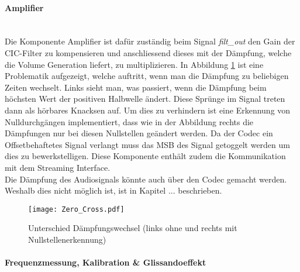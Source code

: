 \paragraph{Amplifier}\mbox{}\\

Die Komponente Amplifier ist dafür zuständig beim Signal \textit{filt\_out} den Gain der CIC-Filter zu kompensieren und anschliessend dieses mit der Dämpfung, welche die Volume Generation liefert, zu multiplizieren. In Abbildung \ref{img:Zero_Cross} ist eine Problematik aufgezeigt, welche auftritt, wenn man die Dämpfung zu beliebigen Zeiten wechselt. Links sieht man, was passiert, wenn die Dämpfung beim höchsten Wert der positiven Halbwelle ändert. Diese Sprünge im Signal treten dann als hörbares Knacksen auf. Um dies zu verhindern ist eine Erkennung von Nulldurchgängen implementiert, dass wie in der Abbildung rechts die Dämpfungen nur bei diesen Nullstellen geändert werden. Da der Codec ein Offsetbehaftetes Signal verlangt muss das MSB des Signal getoggelt werden um dies zu bewerkstelligen. Diese Komponente enthält zudem die Kommunikation mit dem Streaming Interface. \\
Die Dämpfung des Audiosignals könnte auch über den Codec gemacht werden. Weshalb dies nicht möglich ist, ist in Kapitel ...  beschrieben. 
	
\begin{figure}[h!]
	\centering
	\texttt{[image: Zero\_Cross.pdf]}
	\caption{Unterschied Dämpfungswechsel (links ohne und rechts mit Nullstellenerkennung)} 
	\label{img:Zero_Cross}
\end{figure}  


\paragraph{Frequenzmessung, Kalibration \& Glissandoeffekt}\mbox{}\\

